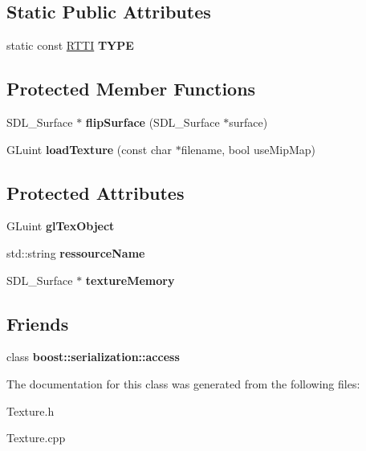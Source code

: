 \subsection*{Static Public Attributes}
\begin{DoxyCompactItemize}
\item 
\hypertarget{class_texture_a27590e7d9d79dd477e37fc0dacedf1f2}{
static const \hyperlink{class_r_t_t_i}{RTTI} {\bfseries TYPE}}
\label{class_texture_a27590e7d9d79dd477e37fc0dacedf1f2}

\end{DoxyCompactItemize}
\subsection*{Protected Member Functions}
\begin{DoxyCompactItemize}
\item 
\hypertarget{class_texture_a48e6b8ac86268c48111d7aee8a9ab93b}{
SDL\_\-Surface $\ast$ {\bfseries flipSurface} (SDL\_\-Surface $\ast$surface)}
\label{class_texture_a48e6b8ac86268c48111d7aee8a9ab93b}

\item 
\hypertarget{class_texture_a6b5ca734aab4547f7847ff2c8cc39f09}{
GLuint {\bfseries loadTexture} (const char $\ast$filename, bool useMipMap)}
\label{class_texture_a6b5ca734aab4547f7847ff2c8cc39f09}

\end{DoxyCompactItemize}
\subsection*{Protected Attributes}
\begin{DoxyCompactItemize}
\item 
\hypertarget{class_texture_a4b6c998e726cb9e63cdd3122d961290e}{
GLuint {\bfseries glTexObject}}
\label{class_texture_a4b6c998e726cb9e63cdd3122d961290e}

\item 
\hypertarget{class_texture_a3e8720fe713ee621f587d4bdbfcb8d12}{
std::string {\bfseries ressourceName}}
\label{class_texture_a3e8720fe713ee621f587d4bdbfcb8d12}

\item 
\hypertarget{class_texture_ad04401a2c4b6795ecdb0addd47a41651}{
SDL\_\-Surface $\ast$ {\bfseries textureMemory}}
\label{class_texture_ad04401a2c4b6795ecdb0addd47a41651}

\end{DoxyCompactItemize}
\subsection*{Friends}
\begin{DoxyCompactItemize}
\item 
\hypertarget{class_texture_ac98d07dd8f7b70e16ccb9a01abf56b9c}{
class {\bfseries boost::serialization::access}}
\label{class_texture_ac98d07dd8f7b70e16ccb9a01abf56b9c}

\end{DoxyCompactItemize}


The documentation for this class was generated from the following files:\begin{DoxyCompactItemize}
\item 
Texture.h\item 
Texture.cpp\end{DoxyCompactItemize}
